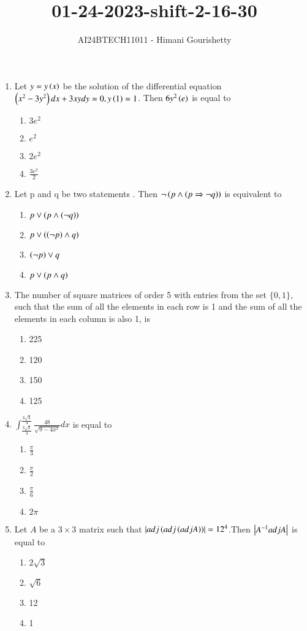 \documentclass[journal,12pt,onecolumn]{IEEEtran}
\theoremstyle{remark}
\begin{document}

\vspace{3cm}

\title{01-24-2023-shift-2-16-30}
\author{AI24BTECH11011 - Himani Gourishetty}
\maketitle
\bigskip

\renewcommand{\thefigure}{\theenumi}
\renewcommand{\thetable}{\theenumi}
\begin{enumerate}
\item Let $y = y\left(x\right)$ be the solution of the differential
equation $\left(x^2-3y^2\right)dx + 3xy dy = 0, y\left(1\right) = 1$. Then
$6y^2\left(e\right)$ is equal to
\begin{enumerate}
    \item $3e^2$
    \item $e^2$
    \item $2e^2$
    \item $\frac{3e^2}{2}$
\end{enumerate}
\item Let p and q be two statements . Then $\neg \left(p \land \left(p \Rightarrow \neg q\right)\right)$ is equivalent to
\begin{enumerate}
    \item $p \lor \left(p \land \left(\neg q\right)\right)$
    \item $p \lor \left(\left(\neg p\right) \land q\right)$
    \item $\left(\neg p\right) \lor q$
    \item $p \lor \left(p \land q\right)$
\end{enumerate}
\item The number of square matrices of order 5 with
entries from the set $\{0, 1\}$, such that the sum of all
the elements in each row is 1 and the sum of all the
elements in each column is also 1, is
\begin{enumerate}
    \item 225
    \item 120
    \item 150
    \item 125
\end{enumerate}
\item $\int_{\frac{3\sqrt{2}}{4}}^{\frac{3\sqrt{3}}{4}}\frac{48}{\sqrt{9-4x^2}}dx$ is equal to
\begin{enumerate}
    \item $\frac{\pi}{3}$
    \item $\frac{\pi}{2}$
    \item $\frac{\pi}{6}$
    \item $2\pi$
\end{enumerate}
\item Let $A$ be a $3 \times 3$ matrix such that $\left\vert adj\left(adj\left(adjA\right)\right)\right\vert=12^4$.Then $\left\vert A^{-1}adjA\right\vert$ is equal to 
\begin{enumerate}
    \item $2\sqrt{3}$
    \item $\sqrt{6}$
    \item 12
    \item 1
\end{enumerate}
\end{enumerate}
\end{document}
